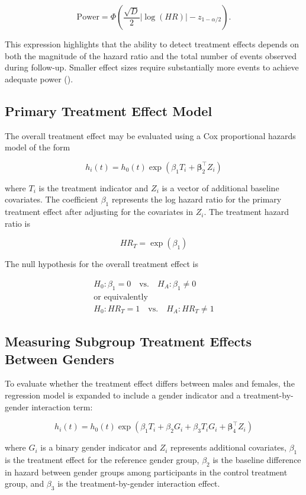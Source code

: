 \documentclass[
  letterpaper,
  DIV=11,
  numbers=noendperiod]{scrartcl}
\begin{document}
\[
\text{Power}
=
\Phi\left(
\frac{\sqrt{D}}{2}|\log(HR)|
-
z_{1-\alpha/2}
\right).
\]

This expression highlights that the ability to detect treatment effects
depends on both the magnitude of the hazard ratio and the total number
of events observed during follow-up. Smaller effect sizes require
substantially more events to achieve adequate power
().

\subsection{Primary Treatment Effect
Model}\label{primary-treatment-effect-model}

The overall treatment effect may be evaluated using a Cox proportional
hazards model of the form

\[
h_i(t) =
h_0(t)\exp\left(
\beta_1 T_i
+ \boldsymbol{\beta}_2^{\top}Z_i
\right)
\]

where \(T_i\) is the treatment indicator and \(Z_i\) is a vector of
additional baseline covariates. The coefficient \(\beta_1\) represents
the log hazard ratio for the primary treatment effect after adjusting
for the covariates in \(Z_i\). The treatment hazard ratio is

\[
HR_T = \exp(\beta_1)
\]

The null hypothesis for the overall treatment effect is

\[
\begin{gathered}
H_0 : \beta_1 = 0 \quad \text{vs.} \quad H_A : \beta_1 \neq 0 \\
\text{or equivalently} \\
H_0 : HR_T = 1 \quad \text{vs.} \quad H_A : HR_T \neq 1
\end{gathered}
\]

\subsection{Measuring Subgroup Treatment Effects Between
Genders}\label{measuring-subgroup-treatment-effects-between-genders}

To evaluate whether the treatment effect differs between males and
females, the regression model is expanded to include a gender indicator
and a treatment-by-gender interaction term:

\[
h_i(t) =
h_0(t)\exp\left(
\beta_1 T_i
+ \beta_2 G_i
+ \beta_3 T_iG_i
+ \boldsymbol{\beta}_4^{\top}Z_i
\right)
\]

where \(G_i\) is a binary gender indicator and \(Z_i\) represents
additional covariates, \(\beta_1\) is the treatment effect for the
reference gender group, \(\beta_2\) is the baseline difference in hazard
between gender groups among participants in the control treatment group,
and \(\beta_3\) is the treatment-by-gender interaction effect.
\end{document}
